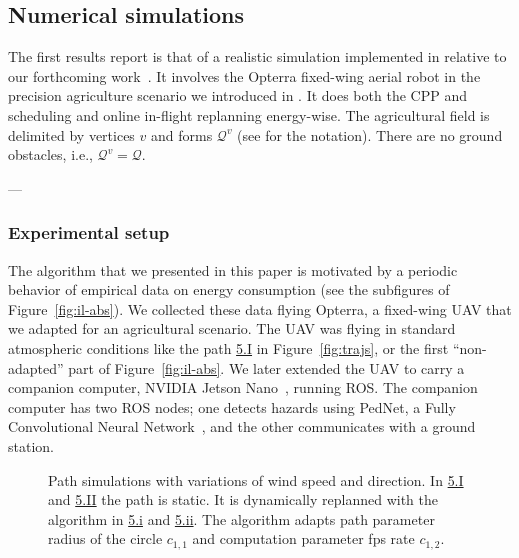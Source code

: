 \subsection{Numerical simulations}
\label{sec:res-num-simu}

The first results report is that of a realistic simulation implemented in \matlab relative to our forthcoming work~\citep{seewald202Xenergy}. It involves the Opterra fixed-wing aerial robot in the precision agriculture scenario we introduced in . It does both the CPP and scheduling and online in-flight replanning energy-wise. The agricultural field is delimited by vertices $v$ and forms $\mathcal{Q}^v$ (see  for the notation). There are no ground obstacles, i.e., $\mathcal{Q}^v=\mathcal{Q}$.

---

\subsubsection*{Experimental setup}

The algorithm that we presented in this paper is motivated by a periodic behavior of empirical data on energy consumption (see the subfigures of Figure~\ref{fig:il-abs}). We collected these data flying Opterra, a fixed-wing UAV that we adapted for an agricultural scenario. The UAV was flying in standard atmospheric conditions like the path \hyperref[fig:trajs-I-static]{5.I} in Figure~\ref{fig:trajs}, or the first ``non-adapted'' part of Figure~\ref{fig:il-abs}. We later extended the UAV to carry a companion computer, NVIDIA Jetson Nano~\cite{nano}, running ROS. The companion computer has two ROS nodes; one detects hazards using PedNet, a Fully Convolutional Neural Network~\cite{ullah2018pednet}, and the other communicates with a ground station.


\begin{figure}[p]
  \centering
  \selectfont
  \footnotesize    
  
  \caption[Path of a static and dynamic plan]{Path simulations with variations of wind speed and direction. In \hyperref[fig:trajs-I-static]{5.I} and \hyperref[fig:trajs-II-static]{5.II} the path is static. It is dynamically replanned with the algorithm in \hyperref[fig:trajs-dyn-i]{5.i} and \hyperref[fig:trajs-dyn-ii]{5.ii}. The algorithm adapts path parameter radius of the circle $c_{1,1}$ and computation parameter fps rate $c_{1,2}$.}
  \label{fig:trajs-revised}
\end{figure}



